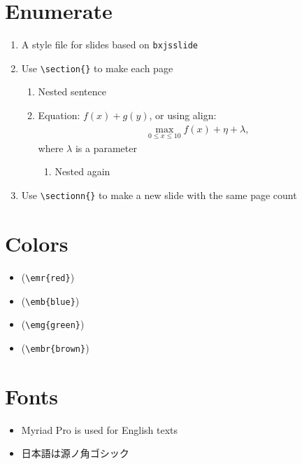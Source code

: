 \documentclass[xelatex,ja=standard,jafont=sourcehan,fleqn,no-math,21pt,paper={142.875truemm}{254truemm},english]{bxjsslidemd}
\begin{document}
\section{Enumerate}
\begin{enumerate}
 \item A style file for slides based on \texttt{bxjsslide}
 \item Use \verb|\section{}| to make each page
       \begin{enumerate}
	\item Nested sentence
	\item Equation: $f(x) + g(y)$, or using align:
	      \begin{align*}
	       \max_{0 \le x \le 10} f(x) + \eta + \lambda,
	      \end{align*}
	      where $\lambda$ is a parameter
	      \begin{enumerate}
	       \item Nested again
	      \end{enumerate}
       \end{enumerate}
 \item Use \verb|\sectionn{}| to make a new slide with the same page count
\end{enumerate}

\section{Colors}
\begin{itemize}
 \item {} (\verb|\emr{red}|)
 \item {} (\verb|\emb{blue}|)
 \item {} (\verb|\emg{green}|)
 \item {} (\verb|\embr{brown}|)
\end{itemize}

\section{Fonts}
\begin{itemize}
 \item Myriad Pro is used for English texts
 \item 日本語は源ノ角ゴシック
\end{itemize}
\end{document}
